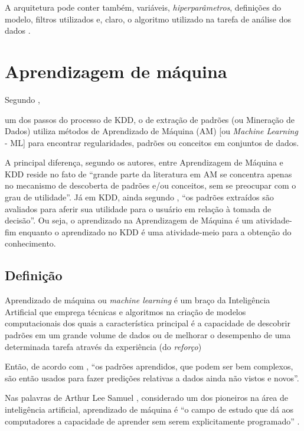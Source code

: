 A arquitetura pode conter também, variáveis, \textit{hiperparâmetros}, definições do modelo, filtros utilizados e, claro, o algoritmo utilizado na tarefa de análise dos dados \cite{deep_learning_book_2019}.

\section{Aprendizagem de máquina} \label{aprendizagem_maquina}
Segundo , 
\begin{citacao}
	um dos passos do processo de KDD, o de extração de padrões (ou Mineração de Dados) utiliza métodos de Aprendizado de Máquina (AM) [ou \textit{Machine Learning} - ML] para encontrar regularidades, padrões ou conceitos em conjuntos de dados.
\end{citacao}

A principal diferença, segundo os autores,  entre Aprendizagem de Máquina e KDD reside no fato de ``grande parte da literatura em AM se concentra apenas no mecanismo de descoberta de padrões e/ou conceitos, sem se preocupar com o grau de utilidade''. Já em KDD, ainda segundo , ``os padrões extraídos são avaliados para aferir sua utilidade para o usuário em relação à tomada de decisão''. Ou seja, o aprendizado na Aprendizagem de Máquina é um atividade-fim enquanto o aprendizado no KDD é uma atividade-meio para a obtenção do conhecimento.

\subsection{Definição}
Aprendizado de máquina ou \textit{machine learning} é um braço da Inteligência Artificial que emprega técnicas e algoritmos na criação de modelos computacionais dos quais a característica principal é a capacidade de descobrir padrões em um grande volume de dados ou de melhorar o desempenho de uma determinada tarefa através da experiência (do \textit{reforço}) \cite{mohri_foundations_2018} \cite{alpaydin_introduction_2014} \cite{swamynathan_mastering_2019}

Então, de acordo com , ``os padrões aprendidos, que podem ser bem complexos, são então usados para fazer predições relativas a dados ainda não vistos e novos''.

Nas palavras de Arthur Lee Samuel , considerado um dos pioneiros na área de inteligência artificial, aprendizado de máquina é ``o campo de estudo que dá aos computadores a capacidade de aprender sem serem explicitamente programado'' \cite[p. 89]{simon_too_2013}. 

